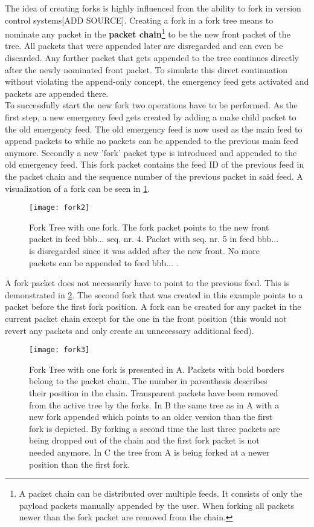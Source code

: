 The idea of creating forks is highly influenced from the ability to fork in version control systems[ADD SOURCE]. Creating a fork in a fork tree means to nominate any packet in the \textbf{packet chain}\footnote{A packet chain can be distributed over multiple feeds. It consists of only the payload packets manually appended by the user. When forking all packets newer than the fork packet are removed from the chain.} to be the new front packet of the tree. All packets that were appended later are disregarded and can even be discarded. Any further packet that gets appended to the tree continues directly after the newly nominated front packet. To simulate this direct continuation without violating the append-only concept, the emergency feed gets activated and packets are appended there. \\
To successfully start the new fork two operations have to be performed. As the first step, a new emergency feed gets created by adding a make child packet to the old emergency feed. The old emergency feed is now used as the main feed to append packets to while no packets can be appended to the previous main feed anymore. Secondly a new 'fork' packet type is introduced and appended to the old emergency feed. This fork packet contains the feed ID of the previous feed in the packet chain and the sequence number of the previous packet in said feed. A visualization of a fork can be seen in \cref{fig:fork2}.

\begin{figure}
\centering
\texttt{[image: fork2]}
\caption{Fork Tree with one fork. The fork packet points to the new front packet in feed bbb... seq. nr. 4. Packet with seq. nr. 5 in feed bbb... is disregarded since it was added after the new front. No more packets can be appended to feed bbb... .}
\label{fig:fork2}
\end{figure}

A fork packet does not necessarily have to point to the previous feed. This is demonstrated in \cref{fig:fork3}. The second fork that was created in this example points to a packet before the first fork position. A fork can be created for any packet in the current packet chain except for the one in the front position (this would not revert any packets and only create an unnecessary additional feed).

\begin{figure}
\centering
\texttt{[image: fork3]}
\caption{Fork Tree with one fork is presented in A. Packets with bold borders belong to the packet chain. The number in parenthesis describes their position in the chain. Transparent packets have been removed from the active tree by the forks. In B the same tree as in A with a new fork appended which points to an older version than the first fork is depicted. By forking a second time the last three packets are being dropped out of the chain and the first fork packet is not needed anymore. In C the tree from A is being forked at a newer position than the first fork.}
\label{fig:fork3}
\end{figure}


